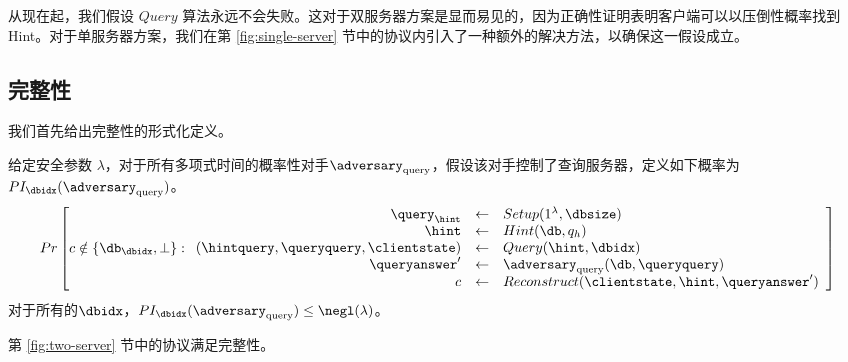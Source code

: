 从现在起，我们假设 $Query$ 算法永远不会失败。这对于双服务器方案是显而易见的，因为正确性证明表明客户端可以以压倒性概率找到Hint。对于单服务器方案，我们在第 \ref{fig:single-server} 节中的协议内引入了一种额外的解决方法，以确保这一假设成立。

\subsection{完整性}
\label{appendix:integrity}

我们首先给出完整性的形式化定义。

\begin{definition}[双服务器方案的完整性]
给定安全参数 $\lambda$，对于所有多项式时间的概率性对手$\adversary_{\mathrm{query}}$，假设该对手控制了查询服务器，定义如下概率为$PI_\dbidx(\adversary_{\mathrm{query}})$。
            $$ Pr\left[
            c \notin \{\db_\dbidx,\bot\}:
            \begin{array}{rcl}
                \query_\hint                          & \leftarrow & Setup(1^\lambda, \dbsize)                       \\
                \hint                                 & \leftarrow & Hint(\db, q_h)                                  \\
                (\hintquery,\queryquery,\clientstate) & \leftarrow & Query(\hint, \dbidx)                            \\
                \queryanswer'                         & \leftarrow & \adversary_{\mathrm{query}}(\db, \queryquery)   \\
                c                                     & \leftarrow & Reconstruct(\clientstate, \hint, \queryanswer') \\
            \end{array}
            \right]$$
对于所有的$\dbidx$，$PI_\dbidx(\adversary_{\mathrm{query}}) \leq \negl(\lambda)$。
\end{definition}

\begin{theorem}
    第 \ref{fig:two-server} 节中的协议满足完整性。
\end{theorem}

